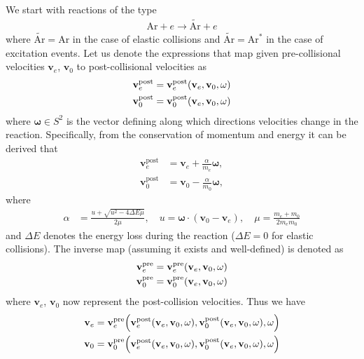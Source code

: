 \documentclass{article}
\newcommand{\vect}[1]{\mathbf{#1}}
\newcommand{\of}[1]{\mleft( #1 \mright)}
\begin{document}
We start with reactions of the type
\begin{align*}
\text{Ar} + e \longrightarrow \tilde{\text{Ar}} + e
\end{align*}
where $\tilde{\text{Ar}} = \text{Ar}$ in the case of elastic collisions and $\tilde{\text{Ar}} = \text{Ar}^\ast$ in the case of excitation events. Let us denote the expressions that map given pre-collisional velocities $\vect{v}_e$, $\vect{v}_0$ to post-collisional velocities as 
\begin{align*}
\vect{v}_e^\text{post} &= \vect{v}_e^\text{post} \of{\vect{v}_e, \vect{v}_0, \vect{\omega}}
\\
\vect{v}_0^\text{post} &= \vect{v}_0^\text{post} \of{\vect{v}_e, \vect{v}_0, \vect{\omega}}
\end{align*} 
where $\vect{\omega} \in S^2$ is the vector defining along which directions velocities change in the reaction. Specifically, from the conservation of momentum and energy it can be derived that
\begin{align*}
\vect{v}_e^\text{post} &= \vect{v}_e + \frac{\alpha}{m_e}\vect{\omega},
\\
\vect{v}_0^\text{post} &= \vect{v}_0 - \frac{\alpha}{m_0}\vect{\omega},
\end{align*}
where
\begin{align*}
\alpha &= \frac{u + \sqrt{u^2 - 4 \Delta E \mu}}{2\mu},
\quad 
u = \vect{\omega} \cdot \left( \vect{v}_0 - \vect{v}_e \right),
\quad 
\mu = \frac{m_e+m_0}{2 m_e m_0}
\end{align*}
and $\Delta E$ denotes the energy loss during the reaction ($\Delta E = 0$ for elastic collisions). The inverse map (assuming it exists and well-defined) is denoted as 
\begin{align*}
\vect{v}_e^\text{pre} &= \vect{v}_e^\text{pre} \of{\vect{v}_e, \vect{v}_0, \vect{\omega}}
\\
\vect{v}_0^\text{pre} &= \vect{v}_0^\text{pre} \of{\vect{v}_e, \vect{v}_0, \vect{\omega}}
\end{align*} 
where $\vect{v}_e$, $\vect{v}_0$ now represent the post-collision velocities. Thus we have 
\begin{align*}
\vect{v}_e &= \vect{v}_e^\text{pre} \of{\vect{v}_e^\text{post} \of{\vect{v}_e, \vect{v}_0, \vect{\omega}}, \vect{v}_0^\text{post} \of{\vect{v}_e, \vect{v}_0, \vect{\omega}}, \vect{\omega}}
\\
\vect{v}_0 &= \vect{v}_0^\text{pre} \of{\vect{v}_e^\text{post} \of{\vect{v}_e, \vect{v}_0, \vect{\omega}}, \vect{v}_0^\text{post} \of{\vect{v}_e, \vect{v}_0, \vect{\omega}}, \vect{\omega}}
\end{align*} 
\end{document}

